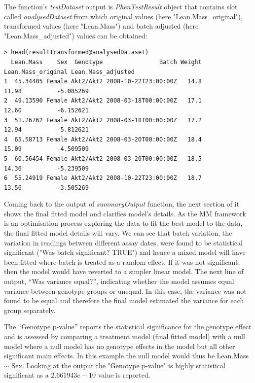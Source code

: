 \documentclass[12pt,a4paper]{article}
\begin{document}
The function's \textit{testDataset} output is \textit{PhenTestResult} object that contains slot called \textit{analysedDataset} from which original values (here "Lean.Mass\_original"), transformed values (here "Lean.Mass") and batch adjusted (here "Lean.Mass\_adjusted") values can be obtained:
\begingroup
    \fontsize{8pt}{12pt}\selectfont
\begin{verbatim}
> head(resultTransformed@analysedDataset)
  Lean.Mass    Sex  Genotype                Batch Weight Lean.Mass_original Lean.Mass_adjusted
1  45.34405 Female Akt2/Akt2 2008-10-22T23:00:00Z   14.8              11.98          -5.085269
2  49.13590 Female Akt2/Akt2 2008-03-18T00:00:00Z   17.1              12.60          -6.152621
3  51.26762 Female Akt2/Akt2 2008-03-18T00:00:00Z   17.2              12.94          -5.812621
4  65.58713 Female Akt2/Akt2 2008-03-20T00:00:00Z   18.4              15.09          -4.509509
5  60.56454 Female Akt2/Akt2 2008-03-20T00:00:00Z   18.5              14.36          -5.239509
6  55.24919 Female Akt2/Akt2 2008-10-22T23:00:00Z   18.7              13.56          -3.505269

\end{verbatim}
\endgroup 
Coming back to the output of \textit{summaryOutput} function, the next section of it shows the final fitted model and clarifies model's details. As the MM framework is an optimisation process exploring the data to fit the best model to the data, 
the final fitted model details will vary. We can see that batch variation, the variation in readings between different assay dates, 
were found to be statistical significant ("Was batch significant? TRUE") and hence a mixed model will have been fitted where batch is treated as a random effect.  
If it was not significant, then the model would have reverted to a simpler linear model.  
The next line of output, “Was variance equal?”, indicating whether the model assumes equal variance between genotype groups or unequal.  
In this case, the variance was not found to be equal and therefore the final model estimated the variance for each group separately. 

The “Genotype p-value” reports the statistical significance for the genotype effect and is assessed by comparing a treatment model (final fitted model) with a null model where a null model 
has no genotype effects in the model but all other significant main effects.  
In this example the null model would thus be Lean.Mass $\sim$ Sex.
Looking at the output the "Genotype p-value" is highly statistical significant as a $2.661943e-10$ value is reported. 
\end{document}
